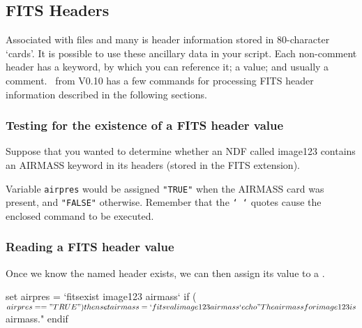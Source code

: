 \documentclass[twoside,11pt,nolof]{starlink}
\providecommand{\KAPPAref}{\xref{{\footnotesize KAPPA}}{sun95}{}}
\providecommand{\NDFref}[1]{\xref{#1}{sun33}{}}
\begin{document}
\newpage
\subsection{FITS Headers\label{sc4_se_FITS_headers}}

Associated with  files and many
\NDFref{\textsf{NDF}s} is header information stored in 80-character
`cards'.  It is possible to use these ancillary data in your script.
Each non-comment header has a keyword, by which you can reference it;
a value; and usually a comment.  \KAPPAref\ from V0.10 has a few
commands for processing \textsf{FITS} header information described in the
following sections.

\subsubsection{Testing for the existence of a FITS header value}

Suppose that you wanted to determine whether an NDF called image123
contains an AIRMASS keyword in its 
headers (stored in the FITS extension).

\begin{small}
\end{small}
Variable \texttt{airpres} would be assigned \texttt{"TRUE"} when the AIRMASS
card was present, and \texttt{"FALSE"} otherwise.  Remember that the
\texttt{`~`} quotes cause the enclosed command to be executed.

\subsubsection{Reading a FITS header value}

Once we know the named header exists, we can then assign its value
to a .

\begin{small}
\begin{terminalv}
     set airpres = `fitsexist image123 airmass`
     if ( $airpres == "TRUE" ) then
        set airmass = `fitsval image123 airmass`
        echo "The airmass for image123 is $airmass."
     endif
\end{terminalv}
\end{small}
\end{document}
